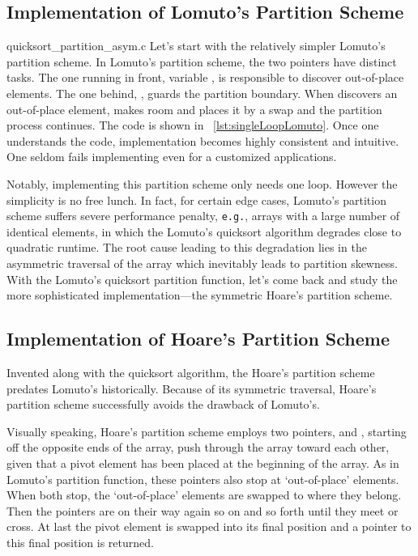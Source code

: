 \subsection{Implementation of Lomuto's Partition Scheme}\label{subsec:impl-of-Lomuto-part-fun}


{quicksort_partition_asym.c}
Let's start with the relatively simpler Lomuto's partition scheme.
In Lomuto's partition scheme, the two pointers have distinct tasks.
The one running in front, variable , is responsible to discover out-of-place elements.
The one behind, , guards the partition boundary.
When  discovers an out-of-place element,  makes
room and places it by a swap and the partition process continues.
The code is shown in ~\autoref{lst:singleLoopLomuto}.
Once one understands the code, implementation becomes highly consistent and intuitive.
One seldom fails implementing even for a customized applications.


Notably, implementing this partition scheme only needs one loop.
However the simplicity is no free lunch.
In fact, for certain edge cases, Lomuto's partition scheme suffers severe performance penalty,
\texttt{e.g.}, arrays with a large number of identical elements,
in which the Lomuto's quicksort algorithm degrades close to quadratic runtime.
The root cause leading to this degradation lies in the asymmetric traversal of the array which
inevitably leads to partition skewness.
With the Lomuto's quicksort partition function, let's come back and study the more sophisticated
implementation---the symmetric Hoare's partition scheme.


\subsection{Implementation of Hoare's Partition Scheme}\label{subsec:impl-of-qsort-part-fun}

Invented along with the quicksort algorithm, the Hoare's partition scheme predates Lomuto's
historically\cite{Hoare1961,Hoare1962,sedgewick:1978}.
Because of its symmetric traversal, Hoare's partition scheme successfully avoids the drawback of
Lomuto's.


Visually speaking, Hoare's partition scheme employs two pointers,  and , starting
off the opposite ends of the array, push through the array toward each other,
given that a pivot element has been placed at the beginning of the array.
As in Lomuto's partition function, these pointers also stop at `out-of-place' elements.
When both stop, the `out-of-place' elements are swapped to where they belong.
Then the pointers are on their way again so on and so forth until they meet or cross.
At last the pivot element is swapped into its final position and a pointer to this final position
is returned.


